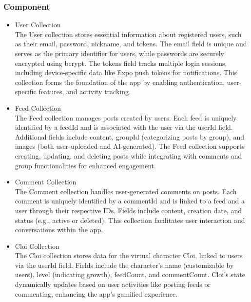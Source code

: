         \subsubsection{Component}
            \begin{itemize}
                \item User Collection\\
                The User collection stores essential information about registered users, such as their email, password, nickname, and tokens. The email field is unique and serves as the primary identifier for users, while passwords are securely encrypted using bcrypt. The tokens field tracks multiple login sessions, including device-specific data like Expo push tokens for notifications. This collection forms the foundation of the app by enabling authentication, user-specific features, and activity tracking.
                \vspace{3mm}
                \item Feed Collection\\
                The Feed collection manages posts created by users. Each feed is uniquely identified by a feedId and is associated with the user via the userId field. Additional fields include content, groupId (categorizing posts by group), and images (both user-uploaded and AI-generated). The Feed collection supports creating, updating, and deleting posts while integrating with comments and group functionalities for enhanced engagement.
                \vspace{3mm}                
                \item Comment Collection\\
                The Comment collection handles user-generated comments on posts. Each comment is uniquely identified by a commentId and is linked to a feed and a user through their respective IDs. Fields include content, creation date, and status (e.g., active or deleted). This collection facilitates user interaction and conversations within the app.
                \vspace{3mm}                
                \item Cloi Collection\\
                The Cloi collection stores data for the virtual character Cloi, linked to users via the userId field. Fields include the character's name (customizable by users), level (indicating growth), feedCount, and commentCount. Cloi's state dynamically updates based on user activities like posting feeds or commenting, enhancing the app's gamified experience.

\end{itemize}
